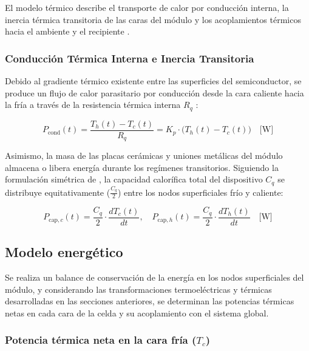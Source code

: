 \documentclass[12pt, a4paper]{article}
\begin{document}
El modelo térmico describe el transporte de calor por conducción interna, la inercia térmica transitoria de las caras del módulo y los acoplamientos térmicos hacia el ambiente y el recipiente \parencite{Kubov_2016}.

\subsubsection{Conducción Térmica Interna e Inercia Transitoria}

Debido al gradiente térmico existente entre las superficies del semiconductor, se produce un flujo de calor parasitario por conducción desde la cara caliente hacia la fría a través de la resistencia térmica interna $R_q$ \parencite{Kubov_2016}:

\begin{equation}
    P_{\text{cond}}(t) = \frac{T_h(t) - T_c(t)}{R_q} = K_p \cdot \big(T_h(t) - T_c(t)\big) \quad \text{[W]}
    \label{eq:p_cond}
\end{equation}

Asimismo, la masa de las placas cerámicas y uniones metálicas del módulo almacena o libera energía durante los regímenes transitorios. Siguiendo la formulación simétrica de \textcite{Kubov_2016}, la capacidad calorífica total del dispositivo $C_q$ se distribuye equitativamente ($\frac{C_q}{2}$) entre los nodos superficiales frío y caliente:

\begin{equation}
    P_{\text{cap}, c}(t) = \frac{C_q}{2} \cdot \frac{dT_c(t)}{dt}, \quad P_{\text{cap}, h}(t) = \frac{C_q}{2} \cdot \frac{dT_h(t)}{dt} \quad \text{[W]}
    \label{eq:p_cap}
\end{equation}

\subsection{Modelo energético}

Se realiza un balance de conservación de la energía en los nodos superficiales del módulo, y considerando las transformaciones termoeléctricas y térmicas desarrolladas en las secciones anteriores, se determinan las potencias térmicas netas en cada cara de la celda y su acoplamiento con el sistema global.

\subsubsection{Potencia térmica neta en la cara fría ($T_c$)}
\end{document}
